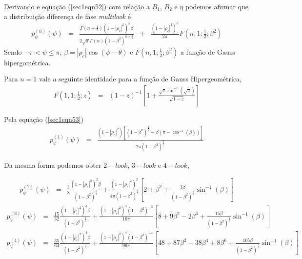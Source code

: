 \documentclass[12pt,a4paper]{article}
\begin{document}
Derivando e equação (\ref{sec1eqn52}) com relação a $B_1$, $B_2$ e $\eta$ podemos afirmar que a distribuição diferença de fase {\it multilook} é 
\begin{equation}\label{sec1eqn53}
\begin{array}{ccccc}
	p_{\psi}^{(n)}(\psi)&=&\frac{\Gamma(n+\frac{1}{2})(1-|\rho_c|^2)^n\beta}{2\sqrt{\pi}\Gamma(n)(1-\beta^2)^{n+\frac{1}{2}}}&+&\frac{(1-|\rho_c|^2)^n}{2\pi}F(n,1;\frac{1}{2};\beta^2)
\end{array}
\end{equation}
Sendo $-\pi<\psi\leq\pi$, $\beta=|\rho_c|\cos(\psi-\theta)$ e $F(n,1;\frac{1}{2};\beta^2)$ a função de Gauss hipergométrica.

Para $n=1$  vale a seguinte identidade para a função de Gauss Hipergeométrica,
\begin{equation}\label{sec1eqn54}
\begin{array}{ccc}
	F(1,1;\frac{1}{2};z)&=&(1-z)^{-1}\left[1+\frac{\sqrt{z}\sin^{-1}(\sqrt{z})}{\sqrt{1-z}}\right]
\end{array}
\end{equation}

Pela equação (\ref{sec1eqn53})
\begin{equation}\label{sec1eqn55}
\begin{array}{ccc}
	p_{\psi}^{(1)}(\psi)&=&\frac{(1-|\rho_c|^2)[(1-\beta^{2})^{\frac{1}{2}}+\beta(\pi-\cos^{-1}(\beta))]}{2\pi(1-\beta^{2})^{\frac{3}{2}}}
\end{array}
\end{equation}

Da mesma forma podemos obter $2-look$, $3-look$ e $4-look$,

\begin{equation}\label{sec1eqn56}
\begin{array}{ccc}
	p_{\psi}^{(2)}(\psi)&=&\frac{3}{8}\frac{(1-|\rho_c|^2)^2\beta}{(1-\beta^2)^{\frac{5}{2}}}+\frac{(1-|\rho_c|^2)^2}{4\pi(1-\beta^2)^{2}}\left[2+\beta^2+\frac{3\beta}{(1-\beta^2)^{\frac{1}{2}}}\sin^{-1}(\beta)\right]
\end{array}
\end{equation}
\begin{equation}\label{sec1eqn57}
\begin{array}{ccc}
	p_{\psi}^{(3)}(\psi)&=&\frac{15}{32}\frac{(1-|\rho_c|^2)^3\beta}{(1-\beta^2)^{\frac{7}{2}}}+\frac{(1-|\rho_c|^2)^3(1-\beta^2)^{-3}}{16\pi}\left[8+9\beta^2-2\beta^4+\frac{15\beta}{(1-\beta^2)^{\frac{1}{2}}}\sin^{-1}(\beta)\right]
\end{array}
\end{equation}
\begin{equation}\label{sec1eqn58}
\begin{array}{ccc}
	p_{\psi}^{(4)}(\psi)&=&\frac{35}{64}\frac{(1-|\rho_c|^2)^4\beta}{(1-\beta^2)^{\frac{9}{2}}}+\frac{(1-|\rho_c|^2)^4(1-\beta^2)^{-4}}{96\pi}\left[48+87\beta^2-38\beta^4+8\beta^6+\frac{105\beta}{(1-\beta^2)^{\frac{1}{2}}}\sin^{-1}(\beta)\right]
\end{array}
\end{equation}
\end{document}
